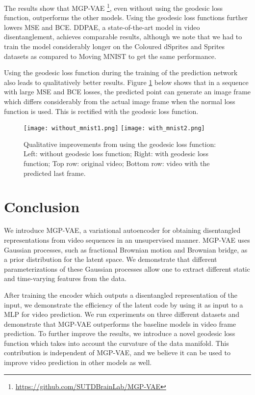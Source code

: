 \documentclass[runningheads]{llncs}
\begin{document}
   The results show that MGP-VAE \footnote{\href{https://github.com/SUTDBrainLab/MGP-VAE}{https://github.com/SUTDBrainLab/MGP-VAE}}, even without using the geodesic loss function, outperforms the other models. Using the geodesic loss functions further lowers MSE and BCE. DDPAE, a state-of-the-art model in video disentanglement, achieves comparable results, although we note that we had to train the model considerably longer on the Coloured dSprites and Sprites datasets as compared to Moving MNIST to get the same performance. \par 

   Using the geodesic loss function during the training of the prediction network also leads to qualitatively better results. Figure \ref{qual} below shows that in a sequence with large MSE and BCE losses, the predicted point can generate an image frame which differs considerably from the actual image frame when the normal loss function is used. This is rectified with the geodesic loss function.

  
   \begin{figure} [H]
      \centering      
      \texttt{[image: without\_mnist1.png]}
      \texttt{[image: with\_mnist2.png]}      
      \caption{Qualitative improvements from using the geodesic loss function: Left: without geodesic loss function; Right: with geodesic loss function; Top row: original video; Bottom row: video with the predicted last frame.}
      \label{qual}
  \end{figure}
   
   \section{Conclusion}
   We introduce MGP-VAE, a variational autoencoder for obtaining disentangled representations from video sequences in an unsupervised manner. MGP-VAE uses Gaussian processes, such as fractional Brownian motion and Brownian bridge, as a prior distribution for the latent space. We demonstrate that different parameterizations of these Gaussian processes allow one to extract different static and time-varying features from the data. \par 

   After training the encoder which outputs a disentangled representation of the input, we demonstrate the efficiency of the latent code by using it as input to a MLP for video prediction. We run experiments on three different datasets and demonstrate that MGP-VAE outperforms the baseline models in video frame prediction. To further improve the results, we introduce a novel geodesic loss function which takes into account the curvature of the data manifold. This contribution is independent of MGP-VAE, and we believe it can be used to improve video prediction in other models as well. \par 
\end{document}
